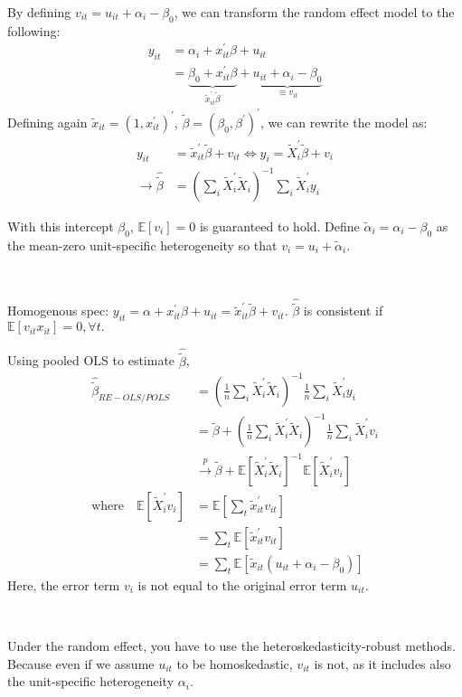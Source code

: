 By defining $v_{it} = u_{it} + \alpha_i - \beta_0$, we can transform the random effect model to the following:
\begin{align*}
    y_{it} &= \alpha_i + x_{it}^{\prime} \beta + u_{it} \\
    &= \underset{\tilde{x}_{it}^{\prime} \tilde{\beta}}{\underbrace{\beta_0 + x_{it}^{\prime}\beta}} + \underset{\equiv v_{it}}{\underbrace{u_{it} + \alpha_i - \beta_0}}
\end{align*}
Defining again $\tilde{x}_{it} = (1, x_{it}^{\prime})^{\prime}$, $\tilde{\beta} = (\beta_0, \beta^{\prime})^{\prime}$, we can rewrite the model as:
\begin{align*}
    y_{it} &= \tilde{x}_{it}^{\prime} \tilde{\beta} + v_{it} \Leftrightarrow y_i = \tilde{X}_i^{\prime} \tilde{\beta} + v_i \\
    \rightarrow \hat{\tilde{\beta}} &= \left(\sum_i \tilde{X}_i^{\prime} \tilde{X}_i \right)^{-1} \sum_i \tilde{X}_i^{\prime} y_i
\end{align*}

With this intercept $\beta_0$, $\mathbb{E}[v_i] = 0$ is guaranteed to hold.
Define $\tilde{\alpha}_i = \alpha_i - \beta_0$ as the mean-zero unit-specific heterogeneity so that $v_i = u_i + \tilde{\alpha}_i.$


\begin{note}[POLS]
    \

    Homogenous spec: $y_{it} = \alpha  + x_{it}^{\prime} \beta + u_{it} = \tilde{x}_{it}^{\prime} \tilde{\beta} + v_{it}.$
    $\hat{\tilde{\beta}}$ is consistent if $\mathbb{E}[v_{it} x_{it}]=0, \forall t.$
\end{note}
Using pooled OLS to estimate $\hat{\tilde{\beta}}$,
\begin{align*}
    \hat{\tilde{\beta}}_{RE-OLS/POLS} &= \left(\frac{1}{n} \sum_i \tilde{X}_i^{\prime} \tilde{X}_i \right)^{-1} \frac{1}{n} \sum_i \tilde{X}_i^{\prime} y_i \\
    &= \tilde{\beta} + \left(\frac{1}{n} \sum_i \tilde{X}_i^{\prime} \tilde{X}_i \right)^{-1} \frac{1}{n} \sum_i \tilde{X}_i^{\prime} v_i \\
    &\overset{p}{\rightarrow} \tilde{\beta} + \mathbb{E}[\tilde{X}_i^{\prime} \tilde{X}_i]^{-1} \mathbb{E}[\tilde{X}_i^{\prime} v_i] \\
    \text{where} \quad \mathbb{E}[\tilde{X}_i^{\prime} v_i] &= \mathbb{E}\left[\sum_t \tilde{x}_{it}^{\prime} v_{it} \right] \\
    &= \sum_t \mathbb{E}\left[\tilde{x}_{it}^{\prime} v_{it}  \right] \\
    &= \sum_t \mathbb{E}\left[\tilde{x}_{it}(u_{it} + \alpha_i - \beta_0)\right]
\end{align*}
Here, the error term $v_i$ is not equal to the original error term $u_{it}$.
\begin{note}
    \

    Under the random effect, you have to use the heteroskedasticity-robust methods.
    Because even if we assume $u_{it}$ to be homoskedastic, $v_{it}$ is not,
    as it includes also the unit-speciﬁc heterogeneity $\alpha_i$.
\end{note}

